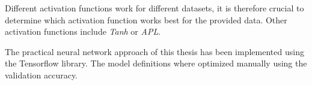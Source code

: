 Different activation functions work for different datasets, it is therefore crucial to determine which activation function works best for the provided data. Other activation functions include
\textit{Tanh} or \textit{APL}\cite[]{Dubey2022}.

The practical neural network approach of this thesis has been implemented using the Tensorflow\cite[]{Abadi2016} library. The model definitions where optimized manually using the validation accuracy.
\label{cha:nn}



